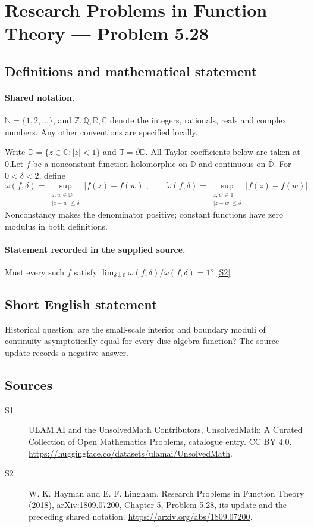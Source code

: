 \documentclass[11pt]{article}
\newcommand{\sref}[2]{\hyperlink{source:#1:#2}{[S#2]}}
\begin{document}
\section{Research Problems in Function Theory — Problem 5.28}\label{statement}

\subsection{Definitions and mathematical statement}

\paragraph{Shared notation.}$\mathbb N=\{1,2,\ldots\}$, and $\mathbb Z,\mathbb Q,\mathbb R,\mathbb C$ denote the integers, rationals, reals and complex numbers. Any other conventions are specified locally.


Write $\mathbb D=\{z\in\mathbb C:|z|<1\}$ and $\mathbb T=\partial\mathbb D$. All Taylor coefficients below are taken at $0$.Let $f$ be a nonconstant function holomorphic on $\mathbb D$ and continuous on $\overline{\mathbb D}$. For $0<\delta<2$, define
\[\omega(f,\delta)=\sup_{\substack{z,w\in\mathbb D\\|z-w|\le\delta}}|f(z)-f(w)|,\qquad
\widetilde\omega(f,\delta)=\sup_{\substack{z,w\in\mathbb T\\|z-w|\le\delta}}|f(z)-f(w)|.
\]
Nonconstancy makes the denominator positive; constant functions have zero modulus in both definitions.
\paragraph{Statement recorded in the supplied source.}
Must every such $f$ satisfy $\lim_{\delta\downarrow0}\omega(f,\delta)/\widetilde\omega(f,\delta)=1$? \sref{statement}{2}
\subsection{Short English statement}
Historical question: are the small-scale interior and boundary moduli of continuity asymptotically equal for every disc-algebra function? The source update records a negative answer.
\subsection{Sources}
\begin{description}
\item[\hypertarget{source:statement:1}{S1}] ULAM.AI and the UnsolvedMath Contributors, UnsolvedMath: A Curated Collection of Open Mathematics Problems, catalogue entry. CC BY 4.0. \url{https://huggingface.co/datasets/ulamai/UnsolvedMath}.
\item[\hypertarget{source:statement:2}{S2}] W. K. Hayman and E. F. Lingham, Research Problems in Function Theory (2018), arXiv:1809.07200, Chapter 5, Problem 5.28, its update and the preceding shared notation. \url{https://arxiv.org/abs/1809.07200}.
\end{description}
\label{end:statement}
\end{document}
